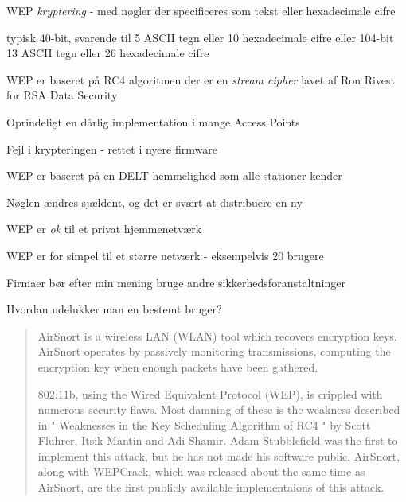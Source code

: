 \documentclass[20pt,landscape,a4paper,footrule]{foils}
\begin{document}

\begin{list1}
\item WEP \emph{kryptering} - med nøgler der specificeres som tekst
  eller hexadecimale cifre
\item typisk 40-bit, svarende til 5 ASCII tegn eller 10 hexadecimale
  cifre eller 104-bit 13 ASCII tegn eller 26 hexadecimale cifre
\item WEP er baseret på RC4 algoritmen der er en \emph{stream cipher}
  lavet af Ron Rivest for RSA Data Security
\end{list1}


\begin{list1}
\item Oprindeligt en dårlig implementation i mange Access Points
\item Fejl i krypteringen - rettet i nyere firmware
\item WEP er baseret på en DELT hemmelighed som alle stationer kender
\item Nøglen ændres sjældent, og det er svært at distribuere en ny
\end{list1}


\begin{list1}
\item WEP er \emph{ok} til et privat hjemmenetværk
\item WEP er for simpel til et større netværk - eksempelvis 20 brugere
\item Firmaer bør efter min mening bruge andre
  sikkerhedsforanstaltninger
\item Hvordan udelukker man en bestemt bruger?
\end{list1}






\begin{quote}
AirSnort is a wireless LAN (WLAN) tool which recovers encryption
keys. AirSnort operates by passively monitoring transmissions,
computing the encryption key when enough packets have been gathered.

802.11b, using the Wired Equivalent Protocol (WEP), is crippled with
numerous security flaws. Most damning of these is the weakness
described in " Weaknesses in the Key Scheduling Algorithm of RC4 "
by Scott Fluhrer, Itsik Mantin and Adi Shamir. Adam Stubblefield
was the first to implement this attack, but he has not made his
software public. AirSnort, along with WEPCrack, which was released
about the same time as AirSnort, are the first publicly available
implementaions of this attack.  
\end{quote}
\end{document}

